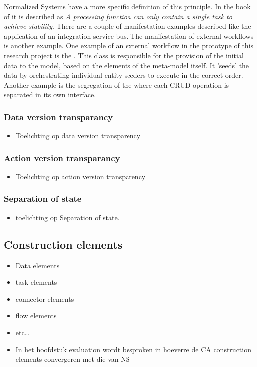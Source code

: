 Normalized Systems have a more specific definition of this principle. 
In the book of
\citeauthor{mannaert_normalized_2016} it is described as \textit{A processing function can
only contain a single task to achieve stability}. There are a couple of 
manifestation examples described like the application of an integration service bus. The
manifestation of external workflows is another example. One example of an external
workflow in the prototype of this research project is the
. This class is responsible for the provision of
the initial data to the model, based on the elements of the meta-model itself. It
'seeds' the data by orchestrating individual entity seeders to execute in the correct
order. Another example is the segregation of the  where each
CRUD operation is separated in its own interface.

\subsubsection{Data version transparancy}
\begin{itemize}
    \item Toelichting op data version transparency
\end{itemize}

\subsubsection{Action version transparancy}
\begin{itemize}
    \item Toelichting op action version transparency
\end{itemize}

\subsubsection{Separation of state}
\begin{itemize}
    \item toelichting op Separation of state.
\end{itemize}

\subsection{Construction elements}
\begin{itemize}
    \item Data elements
    \item task elements
    \item connector elements
    \item flow elements
    \item etc\dots
    \item In het hoofdstuk evaluation wordt
    besproken in hoeverre de CA construction elements convergeren met die van NS
\end{itemize}
